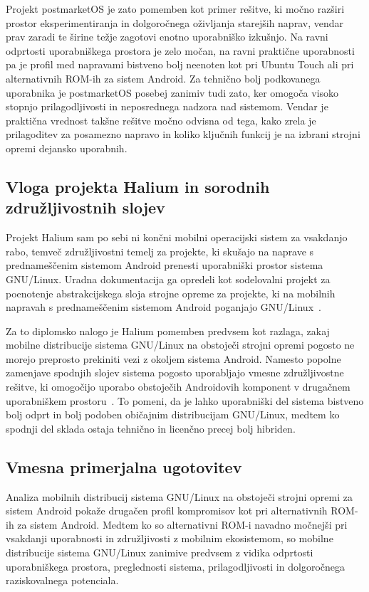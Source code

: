\documentclass[a4paper,12pt,openright]{book}
\begin{document}
Projekt postmarketOS je zato pomemben kot primer rešitve, ki močno razširi prostor eksperimentiranja in dolgoročnega oživljanja starejših naprav, vendar prav zaradi te širine težje zagotovi enotno uporabniško izkušnjo.
Na ravni odprtosti uporabniškega prostora je zelo močan, na ravni praktične uporabnosti pa je profil med napravami bistveno bolj neenoten kot pri Ubuntu Touch ali pri alternativnih ROM-ih za sistem Android.
Za tehnično bolj podkovanega uporabnika je postmarketOS posebej zanimiv tudi zato, ker omogoča visoko stopnjo prilagodljivosti in neposrednega nadzora nad sistemom.
Vendar je praktična vrednost takšne rešitve močno odvisna od tega, kako zrela je prilagoditev za posamezno napravo in koliko ključnih funkcij je na izbrani strojni opremi dejansko uporabnih.

\subsection{Vloga projekta Halium in sorodnih združljivostnih slojev}

Projekt Halium sam po sebi ni končni mobilni operacijski sistem za vsakdanjo rabo, temveč združljivostni temelj za projekte, ki skušajo na naprave s prednameščenim sistemom Android prenesti uporabniški prostor sistema GNU/Linux.
Uradna dokumentacija ga opredeli kot sodelovalni projekt za poenotenje abstrakcijskega sloja strojne opreme za projekte, ki na mobilnih napravah s prednameščenim sistemom Android poganjajo GNU/Linux~\cite{halium_docs_intro}.

Za to diplomsko nalogo je Halium pomemben predvsem kot razlaga, zakaj mobilne distribucije sistema GNU/Linux na obstoječi strojni opremi pogosto ne morejo preprosto prekiniti vezi z okoljem sistema Android.
Namesto popolne zamenjave spodnjih slojev sistema pogosto uporabljajo vmesne združljivostne rešitve, ki omogočijo uporabo obstoječih Androidovih komponent v drugačnem uporabniškem prostoru~\cite{halium_docs_intro,libhybris_readme,sailfish_hadk_libhybris}.
To pomeni, da je lahko uporabniški del sistema bistveno bolj odprt in bolj podoben običajnim distribucijam GNU/Linux, medtem ko spodnji del sklada ostaja tehnično in licenčno precej bolj hibriden.

\subsection{Vmesna primerjalna ugotovitev}

Analiza mobilnih distribucij sistema GNU/Linux na obstoječi strojni opremi za sistem Android pokaže drugačen profil kompromisov kot pri alternativnih ROM-ih za sistem Android.
Medtem ko so alternativni ROM-i navadno močnejši pri vsakdanji uporabnosti in združljivosti z mobilnim ekosistemom, so mobilne distribucije sistema GNU/Linux zanimive predvsem z vidika odprtosti uporabniškega prostora, preglednosti sistema, prilagodljivosti in dolgoročnega raziskovalnega potenciala.
\end{document}
